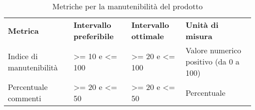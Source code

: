 \renewcommand{\arraystretch}{2.2}
\begin{longtable}{|C{3cm}|C{3cm}|C{3cm}|C{3cm}|}

	\caption{Metriche per la manutenibilità del prodotto}\\
	\hline

	\textbf{Metrica} & \textbf{Intervallo preferibile}  & \textbf{Intervallo ottimale} & \textbf{Unità di misura}
	\tabularnewline
	\endfirsthead

	Indice di manutenibilità &  >= 10 e <= 100 & >= 20 e <= 100 & Valore numerico positivo (da 0 a 100) \\
	Percentuale commenti &  >= 20 e <= 50 & >= 20 e <= 50 & Percentuale \\
\end{longtable}
